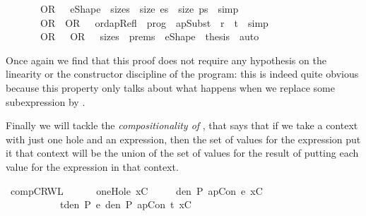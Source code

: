 \documentclass{llncs}
\newenvironment{isacode}
{\begin{list}{}{
\setlength{\leftmargin}{4pt}
\setlength{\rightmargin}{0pt}
\setlength{\listparindent}{0pt}\raggedright
\setlength{\itemsep}{0pt}
\setlength{\parsep}{0pt}
\normalfont\ttfamily }\item[]}
{\end{list}}
\begin{document}
{\begin{isacode}
\ \ \ \ \ \ \isamarkupfalse \ OR\ {\isacharparenleft}{}{\isacharparenright}\ \ e{\isacharprime}Shape\ \isamarkupfalse \ sizes{\isacharprime}\ {\isacharcolon}\ {\isachardoublequoteopen}size\ es{\isacharprime}\ {\isacharequal}\ size\ ps{\isachardoublequoteclose}\ \isamarkupfalse \ simp\ \isanewline
\ \ \ \ \ \ \isamarkupfalse \ OR\ {\isacharparenleft}{}{\isacharparenright}\ OR\ {\isacharparenleft}{}{\isacharparenright}\ \ ordapRefl\ \isamarkupfalse \ {\isachardoublequoteopen}prog\ {\isasymturnstile}\ apSubst\ {\isasymtheta}\ r\ {\isasymrightarrow}\ t{\isacharprime}{\isachardoublequoteclose}\ \isamarkupfalse \ simp\isanewline
\ \ \ \ \ \ \isamarkupfalse \ OR\ {\isacharparenleft}{}{\isacharparenright}\ \ OR\ {\isacharparenleft}{}{\isacharparenright}\ \ sizes{\isacharprime}\ \ prems{\isacharprime}\ \ e{\isacharprime}Shape\ \isamarkupfalse \ {\isacharquery}thesis\ \isamarkupfalse \ auto\isanewline
\ \ \ \ \isamarkupfalse \isanewline
{}\isamarkupfalse \endisatagproof
{\isafoldproof}\isadelimproof
\isanewline
\endisadelimproof
\end{isacode}}{}


Once again we find that this proof does not require any hypothesis on
the linearity or the constructor discipline of the program: this is
indeed quite obvious because this property only talks about what
happens when we replace some subexpression by .

\medskip

Finally we will tackle the \emph{compositionality of \crwl}, that says that if we take a context with just one hole and an expression, then the set of values for the expression put it that context will be the union of the set of values for the result of putting each value for the expression in that context. 

\medskip

\begin{minipage}{\linewidth}
\begin{isacode}
\isamarkupfalse \ compCRWL\ {\isacharcolon}\ \isanewline
\ \ \ \ {\isachardoublequoteopen}oneHole\ xC{\isachardoublequoteclose}\ \isanewline
\ \ \ \ {\isachardoublequoteopen}den\ P\ {\isacharparenleft}apCon\ e\ xC{\isacharparenright}\ {\isacharequal}\isanewline
\ \ \ \ \ \ \ \ \ \ \ {\isacharparenleft}{\isasymUnion}t{\isasymin}den\ P\ e{\isachardot}\ den\ P\ {\isacharparenleft}apCon\ t\ xC{\isacharparenright}{\isacharparenright}{\isachardoublequoteclose}
\end{isacode}
\end{minipage}
\end{document}
